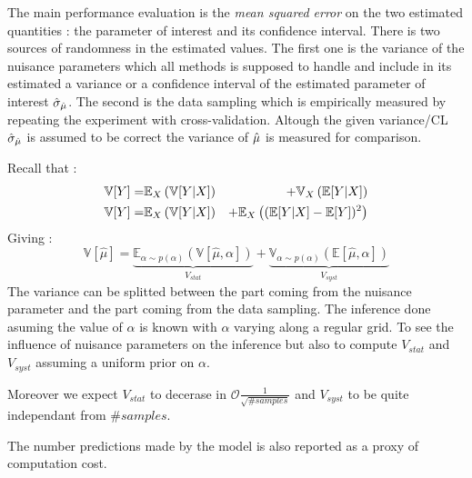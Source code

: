 The main performance evaluation is the \emph{mean squared error} on the two estimated quantities : the parameter of interest and its confidence interval.
There is two sources of randomness in the estimated values.
The first one is the variance of the nuisance parameters which all methods is supposed to handle and include in its estimated a variance or a confidence interval of the estimated parameter of interest $\hat\sigma_{\hat\mu}$.
The second is the data sampling which is empirically measured by repeating the experiment with cross-validation.
Altough the given variance/CL $\hat\sigma_{\hat\mu}$ is assumed to be correct the variance of $\hat\mu$ is measured for comparison.


Recall that :
\begin{eqnarray}
\label{eq:total_variance_law_2}
    \mathbb{V}[Y] =& \mathbb{E}_X \left (\mathbb{V}[Y|X] \right ) &+ \mathbb{V}_X \left (\mathbb{E}[Y|X]\right ) \\
    \mathbb{V}[Y] =& \mathbb{E}_X \left (\mathbb{V}[Y|X] \right ) &+ \mathbb{E}_X \left ( (\mathbb{E} [Y|X]  - \mathbb{E}[Y])^2\right )
\end{eqnarray}
Giving :
\begin{equation}
\label{eq:stat_and_syst_variance_definition_2}
\mathbb{V}[\hat \mu] 
	= \underbrace{\mathbb{E}_{\alpha \sim p(\alpha)} \left (\mathbb{V}[\hat \mu, \alpha] \right )}_{V_{stat}} 
	+ \underbrace{\mathbb{V}_{\alpha \sim p(\alpha)} \left ( \mathbb{E} [\hat \mu, \alpha] \right )}_{V_{syst}}
\end{equation}
The variance can be splitted between the part coming from the nuisance parameter and the part coming from the data sampling.
The inference done asuming the value of $\alpha$ is known with $\alpha$ varying along a regular grid.
To see the influence of nuisance parameters on the inference but also to compute $V_{stat}$ and $V_{syst}$ assuming a uniform prior on $\alpha$.

Moreover we expect $V_{stat}$ to decerase in $\mathcal O \frac{1}{\sqrt{\#samples}}$ and $V_{syst}$ to be quite independant from $\#samples$.

The number predictions made by the model is also reported as a proxy of computation cost.















